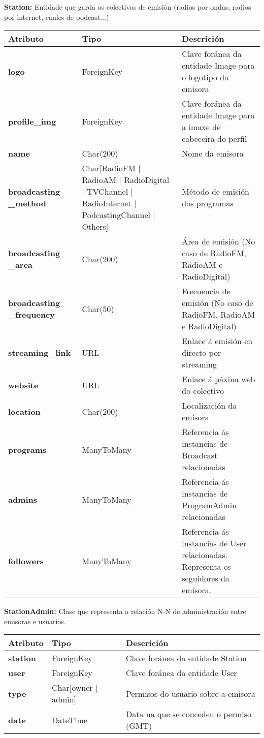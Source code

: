 \textbf{Station:} Entidade que garda os colectivos de emisión (radios por ondas, radios por internet, canles de podcast...)

\begin{tabular}{|p{3cm}|p{3cm}|p{8cm}|}
	\hline
	Atributo & Tipo & Descrición\\
	\hline
	\textbf{logo} & ForeignKey & Clave foránea da entidade Image para o logotipo da emisora\\
	\hline
	\textbf{profile\_img} & ForeignKey & Clave foránea da entidade Image para a imaxe de cabeceira do perfil\\
	\hline
	\textbf{name} & Char(200) & Nome da emisora\\	
	\hline
	\textbf{broadcasting \_method} & Char[RadioFM $|$ RadioAM $|$ RadioDigital $|$ TVChannel $|$ RadioInternet $|$ PodcastingChannel $|$ Others] & Método de emisión dos programas \\
	\hline
	\textbf{broadcasting \_area} & Char(200) & Área de emisión (No caso de RadioFM, RadioAM e RadioDigital)\\
	\hline
	\textbf{broadcasting \_frequency} & Char(50) & Frecuencia de emisión (No caso de RadioFM, RadioAM e RadioDigital)\\
	\hline
	\textbf{streaming\_link} & URL & Enlace á emisión en directo por streaming\\
	\hline
	\textbf{website} & URL & Enlace á páxina web do colectivo\\
	\hline
	\textbf{location} & Char(200) & Localización da emisora\\
	\hline
	\textbf{programs} &  ManyToMany & Referencia ás instancias de Broadcast relacionadas\\
	\hline
	\textbf{admins} &  ManyToMany & Referencia ás instancias de ProgramAdmin relacionadas\\
	\hline
	\textbf{followers} &  ManyToMany & Referencia ás instancias de User relacionadas. Representa os seguidores da emisora.\\
	\hline
\end{tabular}


\textbf{StationAdmin:} Clase que representa a relación N-N de administración entre emisoras e usuarios.

\begin{tabular}{|p{3cm}|p{3cm}|p{8cm}|}
	\hline
	Atributo & Tipo & Descrición\\
	\hline
	\textbf{station} & ForeignKey & Clave foránea da entidade Station\\
	\hline
	\textbf{user} & ForeignKey & Clave foránea da entidade User\\	
	\hline
	\textbf{type} & Char[owner $|$ admin] & Permisos do usuario sobre a emisora\\
	\hline
	\textbf{date} & DateTime & Data na que se concedeu o permiso (GMT)\\
	\hline
\end{tabular}	


